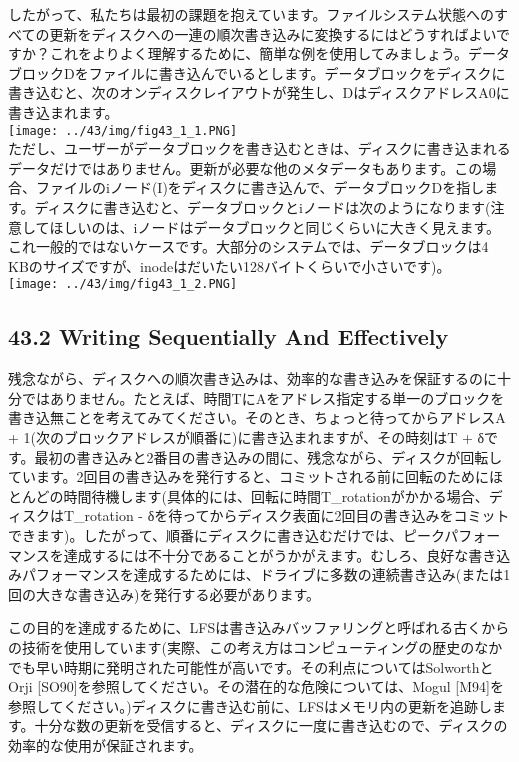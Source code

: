 したがって、私たちは最初の課題を抱えています。ファイルシステム状態へのすべての更新をディスクへの一連の順次書き込みに変換するにはどうすればよいですか？これをよりよく理解するために、簡単な例を使用してみましょう。データブロックDをファイルに書き込んでいるとします。データブロックをディスクに書き込むと、次のオンディスクレイアウトが発生し、DはディスクアドレスA0に書き込まれます。\\
\texttt{[image: ../43/img/fig43\_1\_1.PNG]}\\
ただし、ユーザーがデータブロックを書き込むときは、ディスクに書き込まれるデータだけではありません。更新が必要な他のメタデータもあります。この場合、ファイルのiノード(I)をディスクに書き込んで、データブロックDを指します。ディスクに書き込むと、データブロックとiノードは次のようになります(注意してほしいのは、iノードはデータブロックと同じくらいに大きく見えます。これ一般的ではないケースです。大部分のシステムでは、データブロックは4
KBのサイズですが、inodeはだいたい128バイトくらいで小さいです)。\\
\texttt{[image: ../43/img/fig43\_1\_2.PNG]}

\hypertarget{writing-sequentially-and-effectively}{%
\subsection*{43.2 Writing Sequentially And
Effectively}\label{writing-sequentially-and-effectively}}

残念ながら、ディスクへの順次書き込みは、効率的な書き込みを保証するのに十分ではありません。たとえば、時間TにAをアドレス指定する単一のブロックを書き込無ことを考えてみてください。そのとき、ちょっと待ってからアドレスA
+ 1(次のブロックアドレスが順番に)に書き込まれますが、その時刻はT +
δです。最初の書き込みと2番目の書き込みの間に、残念ながら、ディスクが回転しています。2回目の書き込みを発行すると、コミットされる前に回転のためにほとんどの時間待機します(具体的には、回転に時間T\_rotationがかかる場合、ディスクはT\_rotation
-
δを待ってからディスク表面に2回目の書き込みをコミットできます)。したがって、順番にディスクに書き込むだけでは、ピークパフォーマンスを達成するには不十分であることがうかがえます。むしろ、良好な書き込みパフォーマンスを達成するためには、ドライブに多数の連続書き込み(または1回の大きな書き込み)を発行する必要があります。

この目的を達成するために、LFSは書き込みバッファリングと呼ばれる古くからの技術を使用しています(実際、この考え方はコンピューティングの歴史のなかでも早い時期に発明された可能性が高いです。その利点についてはSolworthとOrji
{[}SO90{]}を参照してください。その潜在的な危険については、Mogul
{[}M94{]}を参照してください。)ディスクに書き込む前に、LFSはメモリ内の更新を追跡します。十分な数の更新を受信すると、ディスクに一度に書き込むので、ディスクの効率的な使用が保証されます。

